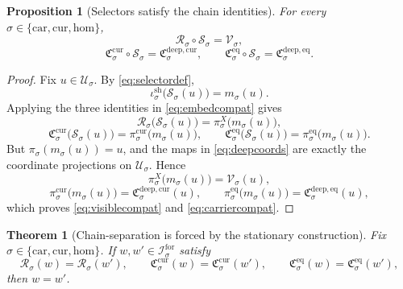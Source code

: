\documentclass[11pt]{article}
\newcommand{\Car}{\mathrm{car}}
\newcommand{\Cur}{\mathrm{cur}}
\newcommand{\Hom}{\mathrm{hom}}
\newcommand{\ForSpace}[1]{\mathcal I_{#1}^{\mathrm{for}}}
\newcommand{\Reduction}[1]{\mathcal R_{#1}}
\newcommand{\CurrentCarrier}[1]{\mathfrak C_{#1}^{\mathrm{cur}}}
\newcommand{\EqCarrier}[1]{\mathfrak C_{#1}^{\mathrm{eq}}}
\newcommand{\DataProj}[1]{\pi_{#1}}
\newcommand{\SubVisible}[1]{\pi_{#1}^{X}}
\newcommand{\SubCurrent}[1]{\pi_{#1}^{\mathrm{cur}}}
\newcommand{\SubEq}[1]{\pi_{#1}^{\mathrm{eq}}}
\newcommand{\ShellEmbed}[1]{\iota_{#1}^{\mathrm{sh}}}
\newcommand{\DeepSpace}[1]{\mathcal U_{#1}}
\newcommand{\VisibleMap}[1]{\mathcal V_{#1}}
\newcommand{\DeepCurrentCarrier}[1]{\mathfrak C_{#1}^{\mathrm{deep,cur}}}
\newcommand{\DeepEqCarrier}[1]{\mathfrak C_{#1}^{\mathrm{deep,eq}}}
\newcommand{\ChainSelect}[1]{\mathcal S_{#1}}
\newtheorem{proposition}{Proposition}
\newtheorem{theorem}{Theorem}
\begin{document}
\begin{proposition}[Selectors satisfy the chain identities]
\label{prop:compat}
For every \(\sigma\in\{\Car,\Cur,\Hom\}\),
\begin{equation}
\Reduction{\sigma}\circ\ChainSelect{\sigma}
=
\VisibleMap{\sigma},
\label{eq:visiblecompat}
\end{equation}
\begin{equation}
\CurrentCarrier{\sigma}\circ\ChainSelect{\sigma}
=
\DeepCurrentCarrier{\sigma},
\qquad
\EqCarrier{\sigma}\circ\ChainSelect{\sigma}
=
\DeepEqCarrier{\sigma}.
\label{eq:carriercompat}
\end{equation}
\end{proposition}

\begin{proof}
Fix \(u\in\DeepSpace{\sigma}\). By \eqref{eq:selectordef},
\[
\ShellEmbed{\sigma}\bigl(\ChainSelect{\sigma}(u)\bigr)=m_{\sigma}(u).
\]
Applying the three identities in \eqref{eq:embedcompat} gives
\[
\Reduction{\sigma}\bigl(\ChainSelect{\sigma}(u)\bigr)
=
\SubVisible{\sigma}\bigl(m_{\sigma}(u)\bigr),
\]
\[
\CurrentCarrier{\sigma}\bigl(\ChainSelect{\sigma}(u)\bigr)
=
\SubCurrent{\sigma}\bigl(m_{\sigma}(u)\bigr),
\qquad
\EqCarrier{\sigma}\bigl(\ChainSelect{\sigma}(u)\bigr)
=
\SubEq{\sigma}\bigl(m_{\sigma}(u)\bigr).
\]
But \(\DataProj{\sigma}(m_{\sigma}(u))=u\), and the maps in \eqref{eq:deepcoords} are exactly the coordinate projections on \(\DeepSpace{\sigma}\). Hence
\[
\SubVisible{\sigma}\bigl(m_{\sigma}(u)\bigr)=\VisibleMap{\sigma}(u),
\]
\[
\SubCurrent{\sigma}\bigl(m_{\sigma}(u)\bigr)=\DeepCurrentCarrier{\sigma}(u),
\qquad
\SubEq{\sigma}\bigl(m_{\sigma}(u)\bigr)=\DeepEqCarrier{\sigma}(u),
\]
which proves \eqref{eq:visiblecompat} and \eqref{eq:carriercompat}.
\end{proof}

\begin{theorem}[Chain-separation is forced by the stationary construction]
\label{thm:separation}
Fix \(\sigma\in\{\Car,\Cur,\Hom\}\). If \(w,w'\in\ForSpace{\sigma}\) satisfy
\begin{equation}
\Reduction{\sigma}(w)=\Reduction{\sigma}(w'),
\qquad
\CurrentCarrier{\sigma}(w)=\CurrentCarrier{\sigma}(w'),
\qquad
\EqCarrier{\sigma}(w)=\EqCarrier{\sigma}(w'),
\label{eq:samedata}
\end{equation}
then \(w=w'\).
\end{theorem}
\end{document}

